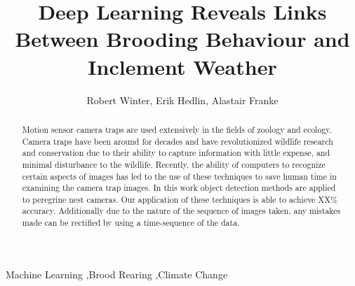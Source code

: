 \documentclass[preprint,review,12pt]{elsarticle}
\begin{document}
\listoftodos
\begin{frontmatter}
%
\title{Deep Learning Reveals Links Between Brooding Behaviour and Inclement Weather}



\maketitle

\author{Robert Winter, Erik Hedlin, Alastair Franke}
\address{Edmonton, Alberta}



\begin{abstract}





Motion sensor camera traps are used extensively in the fields of zoology and ecology. Camera traps have been around for decades and have revolutionized wildlife research and conservation due to their ability to capture information with little expense, and minimal disturbance to the wildlife. Recently, the ability of computers to recognize certain aspects of images has led to the use of these techniques to save human time in examining the camera trap images. In this work object detection methods are applied to peregrine nest cameras. Our application of these techniques is able to achieve XX\% accuracy. Additionally due to the nature of the sequence of images taken, any mistakes made can be rectified by using a time-sequence of the data. 

\end{abstract}


\begin{keyword}
Machine Learning \sep Brood Rearing \sep Climate Change
\end{keyword}

\end{frontmatter}

\linenumbers













%


%
\end{document}

